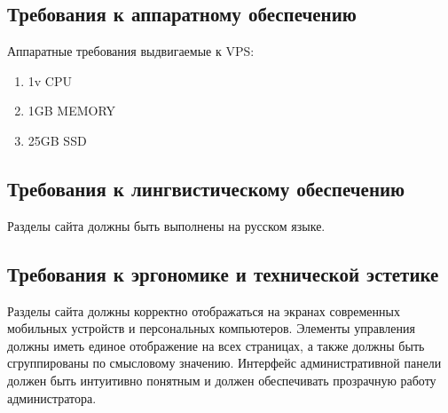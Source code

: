 \subsection{Требования к аппаратному обеспечению}
Аппаратные требования выдвигаемые к VPS:
\begin{enumerate}
    \item 1v CPU
    \item 1GB MEMORY
    \item 25GB SSD
\end{enumerate}

\subsection{Требования к лингвистическому обеспечению}
Разделы сайта должны быть выполнены на русском языке.

\subsection{Требования к эргономике и технической эстетике}
Разделы сайта должны корректно отображаться на экранах современных мобильных устройств и персональных компьютеров.
Элементы управления должны иметь единое отображение на всех страницах, а также должны быть сгруппированы по смысловому значению.
Интерфейс административной панели должен быть интуитивно понятным и должен обеспечивать прозрачную работу администратора.
